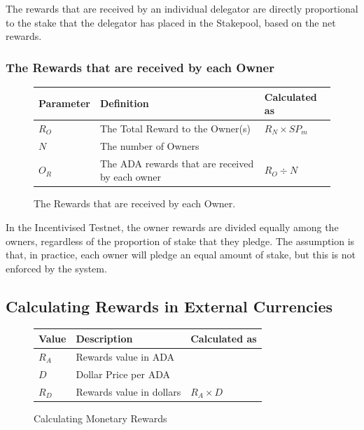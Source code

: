 \documentclass[11pt,a4paper,dvipsnames,twosided]{article}
\newcommand{\ada}{ADA{}}
\begin{document}
\noindent
The rewards that are received by an individual delegator are directly proportional to the
stake that the delegator has placed in the Stakepool, based on the net rewards.

\subsubsection*{The Rewards that are received by each Owner}

\begin{figure}[h!]
\begin{center}
\begin{tabular}{||l|p{6cm}|l||}
  \hline \hline
\textbf{Parameter}  & \textbf{Definition} & \textbf{Calculated as} \\\hline
$R_O$ & The Total Reward to the Owner(s) & $R_N \times SP_m $ \\\hline
$N$ & The number of Owners & \\\hline
$O_R$ & The \ada{} rewards that are received by each owner & $R_O \div N$ \\\hline
\hline
\end{tabular}
\end{center}
\caption{The Rewards that are received by each Owner.}
\end{figure}

\noindent
In the Incentivised Testnet, the owner rewards are divided equally among the
owners, regardless of the proportion of stake that they pledge.  The assumption
is that, in practice, each owner will pledge an equal amount of stake, but this
is not enforced by the system.

\clearpage
\subsection{Calculating Rewards in External Currencies}

\begin{figure}[h!]
\begin{center}
\begin{tabular}{||l|p{6cm}|l||}
  \hline \hline
\textbf{Value} & \textbf{Description} & \textbf{Calculated as} \\\hline
$R_A$ &  Rewards value in \ada{} &\\\hline
$D$ &  Dollar Price per \ada{} &\\\hline
$R_D$ &  Rewards value in dollars & $R_A \times D$ \\\hline
\hline
\end{tabular}
\end{center}
\caption{Calculating Monetary Rewards}
\label{fig:monetary}
\end{figure}
\end{document}
